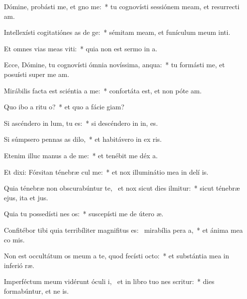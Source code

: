 \item Dómine, probásti me, et gno me:~* tu cognovísti sessiónem meam, et resurrecti am.
\item Intellexísti cogitatiónes as de ge:~* sémitam meam, et funículum meum inti.
\item Et omnes vias meas viti:~* quia non est sermo in  a.
\item Ecce, Dómine, tu cognovísti ómnia novíssima,  anqua:~* tu formásti me, et posuísti super me  am.
\item Mirábilis facta est sciéntia a  me:~* confortáta est, et non póte  am.
\item Quo ibo a ritu o?~* et quo a fácie  giam?
\item Si ascéndero in lum, tu  es:~* si descéndero in in, es.
\item Si súmpsero pennas as dilo,~* et habitávero in ex ris.
\item Etenim illuc manus a de me:~* et tenébit me déx a.
\item Et dixi: Fórsitan ténebræ cul me:~* et nox illuminátio mea in delí is.
\item Quia ténebræ non obscurabúntur  te,~\pscross{} et nox sicut dies ilmitur:~* sicut ténebræ ejus, ita et  jus.
\item Quia tu possedísti nes os:~* suscepísti me de útero  æ.
\item Confitébor tibi quia terribíliter magnifitus es:~\pscross{} mirabília pera a,~* et ánima mea co mis.
\item Non est occultátum os meum a te, quod fecísti  octo:~* et substántia mea in inferió ræ.
\item Imperféctum meum vidérunt óculi i,~\pscross{} et in libro tuo nes scritur:~* dies formabúntur, et ne  is.

